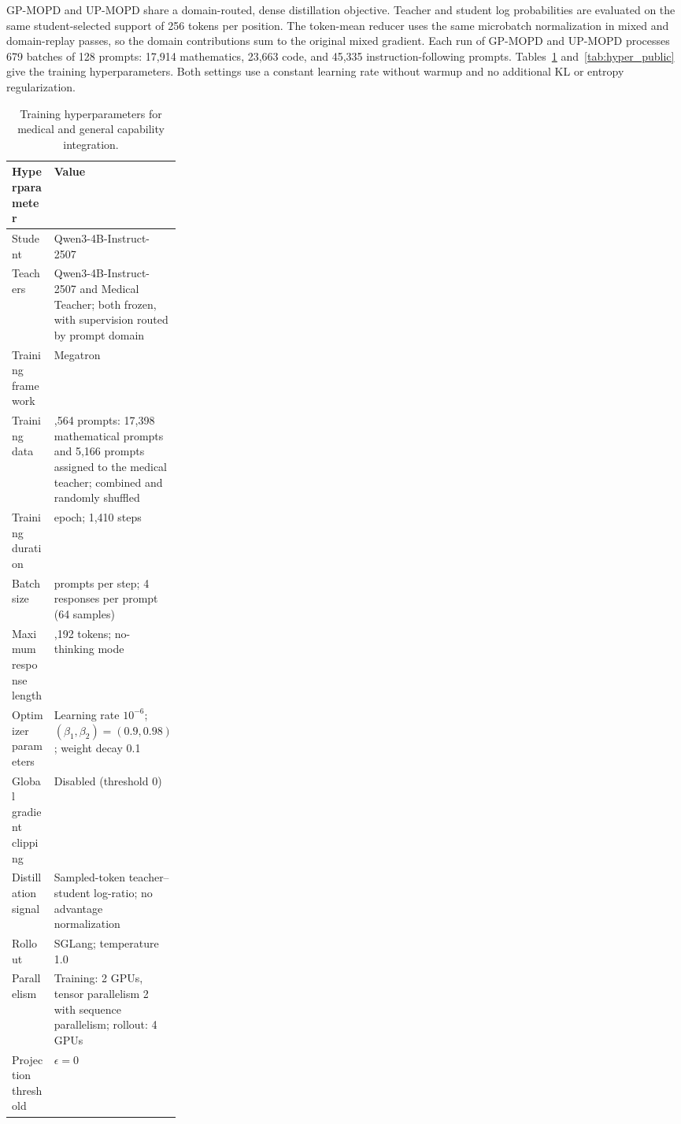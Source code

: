 \documentclass{article}
\begin{document}
GP-MOPD and UP-MOPD share a domain-routed, dense distillation objective.
Teacher and student log probabilities are evaluated on the same
student-selected support of 256 tokens per position. The token-mean reducer uses the same
microbatch normalization in mixed and domain-replay passes, so the
domain contributions sum to the original mixed gradient.
Each run of GP-MOPD and UP-MOPD processes 679 batches of 128 prompts:
17,914 mathematics, 23,663 code, and 45,335 instruction-following prompts. Tables~\ref{tab:hyper_medical} and~\ref{tab:hyper_public} give the
training hyperparameters. Both settings use a constant learning rate
without warmup and no additional KL or entropy regularization.

\begin{table}[H]
\centering
\caption{Training hyperparameters for medical and general capability integration.}
\label{tab:hyper_medical}
\footnotesize
\renewcommand{\arraystretch}{1.15}
\setlength{\tabcolsep}{5pt}
\begin{tabularx}{\linewidth}{@{}>{\raggedright\arraybackslash}p{0.25\linewidth}>{\raggedright\arraybackslash}X@{}}
\toprule
\textbf{Hyperparameter} & \textbf{Value} \\
\midrule
Student & Qwen3-4B-Instruct-2507 \\
Teachers & Qwen3-4B-Instruct-2507 and Medical Teacher; both frozen, with supervision routed by prompt domain \\
Training framework & Megatron \\
Training data & 22,564 prompts: 17,398 mathematical prompts and 5,166 prompts assigned to the medical teacher; combined and randomly shuffled \\
Training duration & 1 epoch; 1,410 steps \\
Batch size & 16 prompts per step; 4 responses per prompt (64 samples) \\
Maximum response length & 8,192 tokens; no-thinking mode \\
Optimizer parameters & Learning rate $10^{-6}$; $(\beta_1,\beta_2)=(0.9,0.98)$; weight decay 0.1 \\
Global gradient clipping & Disabled (threshold 0) \\
Distillation signal & Sampled-token teacher--student log-ratio; no advantage normalization \\
Rollout & SGLang; temperature 1.0 \\
Parallelism & Training: 2 GPUs, tensor parallelism 2 with sequence parallelism; rollout: 4 GPUs \\
Projection threshold & $\epsilon=0$ \\
\bottomrule
\end{tabularx}
\end{table}
\end{document}
